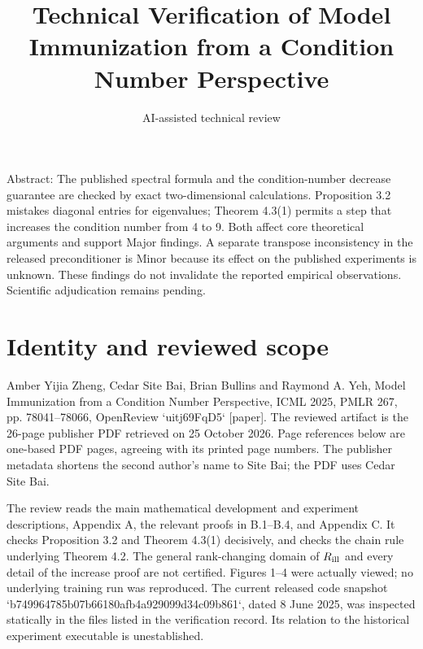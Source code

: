 \documentclass[10pt]{article}
\title{Technical Verification of
Model Immunization from a Condition Number Perspective}
\author{AI-assisted technical review}
\date{}
\begin{document}
\maketitle
Abstract: The published spectral formula and the condition-number decrease guarantee are checked by exact two-dimensional calculations. Proposition 3.2 mistakes diagonal entries for eigenvalues; Theorem 4.3(1) permits a step that increases the condition number from 4 to 9. Both affect core theoretical arguments and support Major findings. A separate transpose inconsistency in the released preconditioner is Minor because its effect on the published experiments is unknown. These findings do not invalidate the reported empirical observations. Scientific adjudication remains pending.\par
\section*{Identity and reviewed scope}
Amber Yijia Zheng, Cedar Site Bai, Brian Bullins and Raymond A. Yeh, Model Immunization from a Condition Number Perspective, ICML 2025, PMLR 267, pp. 78041–78066, OpenReview `uitj69FqD5` [paper]. The reviewed artifact is the 26-page publisher PDF retrieved on 25 October 2026. Page references below are one-based PDF pages, agreeing with its printed page numbers. The publisher metadata shortens the second author’s name to Site Bai; the PDF uses Cedar Site Bai.\par
The review reads the main mathematical development and experiment descriptions, Appendix A, the relevant proofs in B.1–B.4, and Appendix C. It checks Proposition 3.2 and Theorem 4.3(1) decisively, and checks the chain rule underlying Theorem 4.2. The general rank-changing domain of \(R_{\rm ill}\) and every detail of the increase proof are not certified. Figures 1–4 were actually viewed; no underlying training run was reproduced. The current released code snapshot `b749964785b07b66180afb4a929099d34c09b861`, dated 8 June 2025, was inspected statically in the files listed in the verification record. Its relation to the historical experiment executable is unestablished.\par
\end{document}

